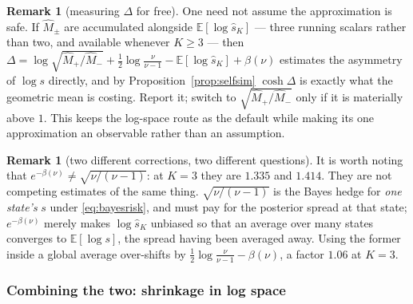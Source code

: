 \documentclass[11pt]{article}
\theoremstyle{definition}
\newtheorem{remark}[proposition]{Remark}
\newcommand{\E}{\mathbb{E}}
\begin{document}
\begin{remark}[measuring $\Delta$ for free]
\label{rem:measuredelta}
One need not assume the approximation is safe. If $\widehat M_\pm$ are
accumulated alongside $\E[\log\hat s_K]$ --- three running scalars rather than
two, and available whenever $K\ge3$ --- then
$\Delta=\log\sqrt{\widehat M_+/\widehat M_-}+\tfrac12\log\frac{\nu}{\nu-1}
-\E[\log\hat s_K]+\beta(\nu)$ estimates the asymmetry of $\log s$ directly, and by
Proposition~\ref{prop:selfsim} $\cosh\Delta$ is exactly what the geometric mean
is costing. Report it; switch to $\sqrt{\widehat M_+/\widehat M_-}$ only if it is
materially above $1$. This keeps the log-space route as the default while making
its one approximation an observable rather than an assumption.
\end{remark}

\begin{remark}[two different corrections, two different questions]
\label{rem:twocorrections}
It is worth noting that $e^{-\beta(\nu)}\neq\sqrt{\nu/(\nu-1)}$: at $K=3$ they
are $1.335$ and $1.414$. They are not competing estimates of the same thing.
$\sqrt{\nu/(\nu-1)}$ is the Bayes hedge for \emph{one state's} $s$ under
\eqref{eq:bayesrisk}, and must pay for the posterior spread at that state;
$e^{-\beta(\nu)}$ merely makes $\log\hat s_K$ unbiased so that an average over
many states converges to $\E[\log s]$, the spread having been averaged away.
Using the former inside a global average over-shifts by
$\tfrac12\log\frac{\nu}{\nu-1}-\beta(\nu)$, a factor $1.06$ at $K=3$.
\end{remark}

\subsubsection*{Combining the two: shrinkage in log space}
\end{document}
